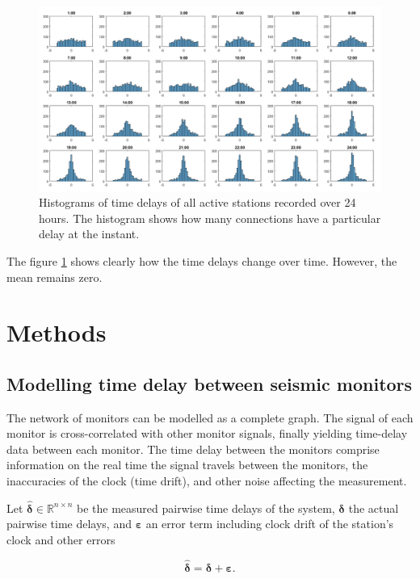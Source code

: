 \documentclass[12pt,a4paper,english]{article}
\begin{document}
\begin{figure}[ht]
  \begin{center}   
   \includegraphics[width=\textwidth]{hourlydelaydistributionoverallstationsforoneday.png}
  \end{center}
  \caption{Histograms of time delays of all active stations recorded over 24 hours. The histogram shows how many connections have a particular delay at the instant.}\label{fig:histograms}
\end{figure}
The figure \ref{fig:histograms} shows clearly how the time delays change over time. However, the mean remains zero.


\section{Methods}

\subsection{Modelling time delay between seismic monitors}
The network of monitors can be modelled as a complete graph. The signal of each monitor is cross-correlated with other monitor signals, finally yielding time-delay data between each monitor. The time delay between the monitors comprise information on the real time the signal travels between the monitors, the inaccuracies of the clock (time drift), and other noise affecting the measurement. 

Let $\bm{\hat{\delta}} \in \mathbb{R}^{n\times n}$ be the measured pairwise time delays of the system, $\bm{\delta}$ the actual pairwise time delays, and $\bm{\varepsilon}$ an error term including clock drift of the station's clock and other errors

\begin{equation}
\bm{\hat{\delta}}  = \bm{\delta} + \bm{\varepsilon}.
\label{eq:model}
\end{equation}
 
\end{document}
